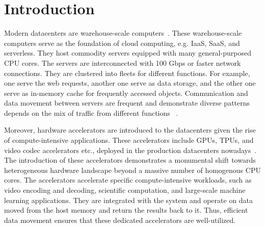 \chapter{Introduction}

Modern datacenters are warehouse-scale computers~\cite{datacenter-as-a-computer:2013}.
%
These warehouse-scale computers serve as the foundation of cloud computing, e.g. IaaS, SaaS, and serverless.
%
They host commodity servers equipped with many general-purposed CPU cores.
%
The servers are interconnected with 100 Gbps or faster network connections.
%
They are clustered into fleets for different functions. For example, one serve the web requests, another one serve as data storage, and the other one serve as in-memory cache for frequently accessed objects.
%
Communication and data movement between servers are frequent and demonstrate diverse patterns depends on the mix of traffic from different functions 
~\cite{nishtala_memcached_nsdi13, google-datacenter-isca15, facebook_datacenter:hpca:2018,azure_serverless_computing:2021}.

Moreover, hardware accelerators are introduced to the datacenters given the rise of compute-intensive applications. 
%
These accelerators include GPUs, TPUs, and video codec accelerators etc., deployed in the production datacenters nowadays~\cite{tpu:isca:2017, google-vcu:asplos:2021, google-datacenter-isca15, aws-trainium:2022,aws-inferentia:2019}.
%
The introduction of these accelerators demonstrates a monumental shift towards heterogeneous hardware landscape beyond a massive number of homogenous CPU cores.   
%
The accelerators accelerate specific compute-intensive workloads, such as video encoding and decoding, scientific computation, and large-scale machine learning applications.
%
They are integrated with the system and operate on data moved from the host memory and return the results back to it. 
%
Thus, efficient data movement ensures that these dedicated accelerators are well-utilized.

